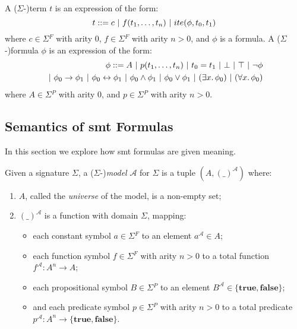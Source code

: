 \begin{definition}\label{def:terms-and-formulas}
  A ($\Sigma{}$-)term $t$ is an expression of the form:
  \[t ::= c \ |\  f(t_1,\ldots,t_n) \ |\  ite(\phi{}, t_0, t_1)\]
  where $c \in \Sigma{}^F$ with arity 0, $f \in \Sigma{}^F$ with arity
  $n > 0$, and $\phi{}$ is a formula.
  A ($\Sigma{}$-)formula $\phi{}$ is an expression of the form:
  \begin{align*}
  \phi{} ::= A
    \ |\  p(t_1,\ldots,t_n)
    \ |\  t_0 = t_1
    \ |\  \bot{}
    \ |\  \top{}
    \ |\  \neg{}\phi{} \\
    \ |\  \phi{}_0 \rightarrow{} \phi{}_1
    \ |\  \phi{}_0 \leftrightarrow{} \phi{}_1
    \ |\  \phi{}_0 \land{} \phi{}_1
    \ |\  \phi{}_0 \lor{} \phi{}_1
    \ |\  (\exists{}x\ldotp\phi{}_0)
    \ |\  (\forall{}x\ldotp\phi{}_0)
  \end{align*}
  where $A \in \Sigma{}^P$ with arity 0, and $p \in \Sigma{}^P$ with arity
  $n > 0$.
\end{definition}

\subsection{Semantics of \gls{smt} Formulas}
\label{sec:smt-semantics}

In this section we explore how \gls{smt} formulas are given meaning.

\begin{definition}[Model]
  Given a signature $\Sigma{}$, a ($\Sigma{}$-)\textit{model} $\mathcal{A}$ for
  $\Sigma{}$ is a tuple $(A, (\_)^{\mathcal{A}})$ where:
  \begin{enumerate}
  \item $A$, called the \textit{universe} of the model, is a non-empty set;
  \item $(\_)^{\mathcal{A}}$ is a function with domain $\Sigma{}$, mapping:
    \begin{itemize}
    \item each constant symbol $a \in \Sigma{}^F$ to an element
      $a^{\mathcal{A}} \in A$;
    \item each function symbol $f \in \Sigma{}^F$ with arity $n > 0$ to a total
      function $f^{\mathcal{A}}\colon A^n \to A$;
    \item each propositional symbol $B \in \Sigma{}^P$ to an element
      $B^{\mathcal{A}} \in \{\mathbf{true}, \mathbf{false}\}$;
    \item and each predicate symbol $p \in \Sigma{}^P$ with arity $n > 0$ to a
      total predicate $p^{\mathcal{A}}\colon A^n \to \{\mathbf{true},
      \mathbf{false}\}$.
    \end{itemize}
  \end{enumerate}
\end{definition}

